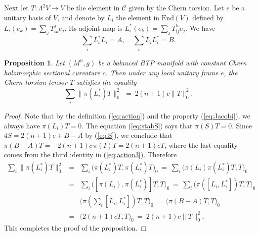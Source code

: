 \documentclass{amsart}
\newtheorem{proposition}{Proposition}
\begin{document}
Next let $T:\Lambda^2V\rightarrow V$ be the element in ${\mathcal C}$ given by the Chern torsion. Let  $e$ be a unitary basis of $V$, and denote by $L_i$ the element in $\mbox{End}(V)$ defined by $L_i(e_k)=\sum_j T^j_{ik}e_j$. Its adjoint map is $L_i^{\ast}(e_k) = \sum_j \overline{T^k_{ij}}e_j$. We have
\begin{equation}
\sum_i L_i^{\ast} L_i = A, \ \ \ \ \ \sum_i L_iL_i^{\ast} = B.
\end{equation}

\begin{proposition} \label{prop1}
Let $(M^n,g)$ be a balanced BTP manifold with constant Chern holomorphic sectional curvature $c$. Then under any local unitary frame $e$, the Chern torsion tensor $T$ satisfies the equality
\begin{equation}  \label{eq:square}
\sum_i \parallel\! \pi(L_i^{\ast})T\!\parallel^2_0 \ \, = \ 2(n+1)c \parallel\! T\!\parallel^2_0.
\end{equation}
\end{proposition}

\begin{proof}
Note that by the definition (\ref{eq:action}) and the property (\ref{eq:Jacobi}), we always have $\pi(L_i)T=0$. The equation (\ref{eq:stabS}) says that $\pi (S)T =0$. Since $4S=2(n+1)c+B-A$ by (\ref{eq:S}), we conclude that $\pi(B-A)T = -2(n+1)c \,\pi(I)T = 2(n+1)cT$, where the last equality comes from the third identity in (\ref{eq:action3}). Therefore
\begin{eqnarray*}
\sum_i \parallel\! \pi(L_i^{\ast})T\!\parallel^2_0  & = & \sum_i \big( \pi(L_i^{\ast})T, \pi(L_i^{\ast})T\big)_0 \ = \ \sum_i \big( \pi(L_i)\pi(L_i^{\ast})T, T\big)_0 \\
& = & \sum_i \big( [\pi(L_i),\pi(L_i^{\ast})]T, T\big)_0 \ = \ \sum_i \big( \pi([L_i,L_i^{\ast}])T, T\big)_0 \\
& = &  \big( \pi ( \sum_i [L_i, L_i^{\ast}])T, T\big)_0 \ = \ \big( \pi(B-A)T, T\big)_0 \\
& = & \big( 2(n+1)cT, T\big)_0 \ = \ 2(n+1)c \parallel\!T\!\parallel^2_0.
\end{eqnarray*}
This completes the proof of the proposition.
\end{proof}
\end{document}
